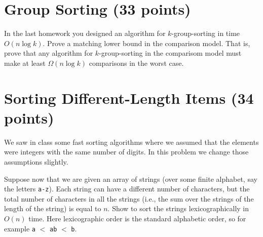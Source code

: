 \documentclass[11pt]{article}
\begin{document}
\section{Group Sorting (33 points)}
In the last homework you designed an algorithm for $k$-group-sorting in time $O(n \log k)$.  Prove a matching lower bound in the comparison model.  That is, prove that any algorithm for $k$-group-sorting in the comparisom model must make at least $\Omega(n \log k)$ comparisons in the worst case.




\section{Sorting Different-Length Items (34 points)}
We saw in class some fast sorting algorithms where we assumed that the elements were integers with the same number of digits.  In this problem we change those assumptions slightly.

Suppose now that we are given an array of strings (over some finite alphabet, say the letters {\tt a-z}).  Each string can have a different number of characters, but the total number of characters in all the strings (i.e., the sum over the strings of the length of the string) is equal to $n$.  Show to sort the strings lexicographically in $O(n)$ time.  Here lexicographic order is the standard alphabetic order, so for example {\tt a} $<$ {\tt ab} $<$ {\tt b}.
\end{document}
